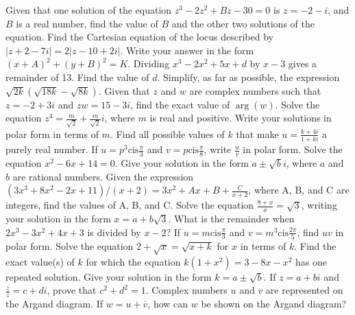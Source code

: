 \documentclass[12pt,addpoints]{exam}
\begin{document}
\begin{questions}
\fillwithlines{3cm}
\question[5] Given that one solution of the equation \( z^3 - 2z^2 + Bz - 30 = 0 \) is \( z = -2 - i \), and \( B \) is a real number, find the value of \( B \) and the other two solutions of the equation.
\fillwithlines{3cm}
\question[5] Find the Cartesian equation of the locus described by \( |z + 2 - 7i| = 2|z - 10 + 2i| \). Write your answer in the form \( (x + A)^2 + (y + B)^2 = K \).
\fillwithlines{3cm}
\question[5] Dividing \(x^3 - 2x^2 + 5x + d\) by \(x - 3\) gives a remainder of 13. Find the value of \(d\).
\fillwithlines{3cm}
\question[5] Simplify, as far as possible, the expression \(\sqrt{2k} \left( \sqrt{18k} - \sqrt{8k} \right)\).
\fillwithlines{3cm}
\question[5] Given that \(z\) and \(w\) are complex numbers such that \(z = -2 + 3i\) and \(zw = 15 - 3i\), find the exact value of \(\arg(w)\).
\fillwithlines{3cm}
\question[5] Solve the equation \( z^4 = \frac{m}{\sqrt{2}} + \frac{m}{\sqrt{2}} i \), where \( m \) is real and positive. Write your solutions in polar form in terms of \( m \).
\fillwithlines{3cm}
\question[5] Find all possible values of \( k \) that make \( u = \frac{k + 4i}{1 + ki} \) a purely real number.
\fillwithlines{3cm}
\question[5] If \( u = p^{3} \text{cis} \frac{\pi}{3} \) and \( v = p \text{cis} \frac{\pi}{8} \), write \( \frac{u}{v} \) in polar form.
\fillwithlines{3cm}
\question[5] Solve the equation \( x^2 - 6x + 14 = 0 \). Give your solution in the form \( a \pm \sqrt{b}i \), where \( a \) and \( b \) are rational numbers.
\fillwithlines{3cm}
\question[5] Given the expression \((3x^3 + 8x^2 - 2x + 11) / (x + 2) = 3x^2 + Ax + B + \frac{C}{x + 2}\), where A, B, and C are integers, find the values of A, B, and C.
\fillwithlines{3cm}
\question[5] Solve the equation \(\frac{8 + x}{x} = \sqrt{3}\), writing your solution in the form \(x = a + b\sqrt{3}\).
\fillwithlines{3cm}
\question[5] What is the remainder when \(2x^3 - 3x^2 + 4x + 3\) is divided by \(x - 2\)?
\fillwithlines{3cm}
\question[5] If \( u = m \text{cis} \frac{\pi}{3} \) and \( v = m^3 \text{cis} \frac{2\pi}{5} \), find \( uv \) in polar form.
\fillwithlines{3cm}
\question[5] Solve the equation \(2 + \sqrt{x} = \sqrt{x + k}\) for \(x\) in terms of \(k\).
\fillwithlines{3cm}
\question[5] Find the exact value(s) of \( k \) for which the equation \( k(1 + x^2) = 3 - 8x - x^2 \) has one repeated solution. Give your solution in the form \( k = a \pm \sqrt{b} \).
\fillwithlines{3cm}
\question[5] If \( z = a + bi \) and \( \frac{z}{\overline{z}} = c + di \), prove that \( c^2 + d^2 = 1 \).
\fillwithlines{3cm}
\question[5] Complex numbers \( u \) and \( v \) are represented on the Argand diagram. If \( w = u + \overline{v} \), how can \( w \) be shown on the Argand diagram?

\end{questions}
\end{document}
